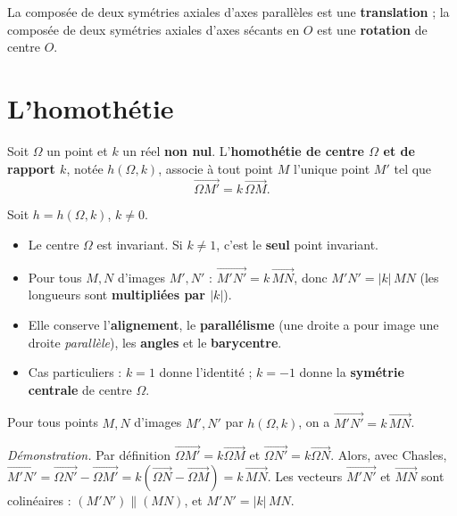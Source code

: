 \begin{remarque}
La composée de deux symétries axiales d'axes parallèles est une \textbf{translation} ;
la composée de deux symétries axiales d'axes sécants en $O$ est une
\textbf{rotation} de centre $O$.
\end{remarque}

\section{L'homothétie}

\begin{definition}
Soit $\Omega$ un point et $k$ un réel \textbf{non nul}. L'\textbf{homothétie de
centre $\Omega$ et de rapport $k$}, notée $h(\Omega,k)$, associe à tout point $M$
l'unique point $M'$ tel que
\[ \overrightarrow{\Omega M'}=k\,\overrightarrow{\Omega M}. \]
\end{definition}

\begin{propriete}
Soit $h=h(\Omega,k)$, $k\neq 0$.
\begin{itemize}
  \item Le centre $\Omega$ est invariant. Si $k\neq 1$, c'est le \textbf{seul}
        point invariant.
  \item Pour tous $M,N$ d'images $M',N'$ : $\overrightarrow{M'N'}=k\,\overrightarrow{MN}$,
        donc $M'N'=|k|\,MN$ (les longueurs sont \textbf{multipliées par $|k|$}).
  \item Elle conserve l'\textbf{alignement}, le \textbf{parallélisme}
        (une droite a pour image une droite \emph{parallèle}), les \textbf{angles}
        et le \textbf{barycentre}.
  \item Cas particuliers : $k=1$ donne l'identité ; $k=-1$ donne la \textbf{symétrie
        centrale} de centre $\Omega$.
\end{itemize}
\end{propriete}

\begin{theoreme}
Pour tous points $M,N$ d'images $M',N'$ par $h(\Omega,k)$, on a
$\overrightarrow{M'N'}=k\,\overrightarrow{MN}$.
\end{theoreme}

\begin{remarque}
\textit{Démonstration.} Par définition $\overrightarrow{\Omega M'}=k\overrightarrow{\Omega M}$
et $\overrightarrow{\Omega N'}=k\overrightarrow{\Omega N}$. Alors, avec Chasles,
$\overrightarrow{M'N'}=\overrightarrow{\Omega N'}-\overrightarrow{\Omega M'}
=k(\overrightarrow{\Omega N}-\overrightarrow{\Omega M})=k\,\overrightarrow{MN}$.
Les vecteurs $\overrightarrow{M'N'}$ et $\overrightarrow{MN}$ sont colinéaires :
$(M'N')\parallel(MN)$, et $M'N'=|k|\,MN$.
\end{remarque}

